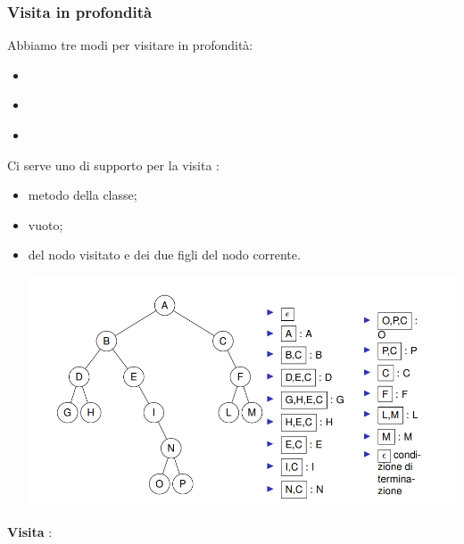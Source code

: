 \subsubsection{Visita in profondità}
Abbiamo tre modi per visitare in profondità:
\begin{itemize}
    \item \textbf{\textcolor{blue}{}}
    \item \textbf{\textcolor{blue}{}}
    \item \textbf{\textcolor{blue}{}}\newline\newline
\end{itemize}
Ci serve uno \textcolor{blue}{} di supporto per la visita \textbf{\textcolor{blue}{}}:
\begin{itemize}
    \item \textbf{\textcolor{blue}{}} metodo della classe;
    \item \textbf{\textcolor{blue}{}}  vuoto;
    \item \textbf{\textcolor{blue}{}}  del nodo visitato e  dei due figli del nodo corrente.
    \begin{center}
        \includegraphics[scale = 0.6]{Capitoli/Iteratori/Esempi/visita PreOrder.png}
    \end{center}
\end{itemize}
\newpage
\textbf{Visita} \textbf{\textcolor{blue}{}}:
